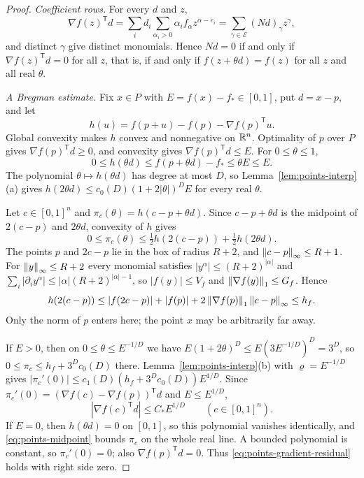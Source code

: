 \begin{proof}
\emph{Coefficient rows.} For every $d$ and $z$,
\[
 \nabla f(z)^{\mathsf T}d=\sum_i d_i\sum_{\alpha_i>0}\alpha_if_\alpha
 z^{\alpha-e_i}=\sum_{\gamma\in\mathcal E}(Nd)_\gamma z^\gamma ,
\]
and distinct $\gamma$ give distinct monomials. Hence $Nd=0$ if and only if
$\nabla f(z)^{\mathsf T}d=0$ for all $z$, that is, if and only if
$f(z+\theta d)=f(z)$ for all $z$ and all real $\theta$.

\emph{A Bregman estimate.} Fix $x\in P$ with
$E=f(x)-f_*\in[0,1]$, put $d=x-p$, and let
\[
 h(u)=f(p+u)-f(p)-\nabla f(p)^{\mathsf T}u .
\]
Global convexity makes $h$ convex and nonnegative on $\mathbb R^n$. Optimality of
$p$ over $P$ gives $\nabla f(p)^{\mathsf T}d\ge0$, and convexity gives
$\nabla f(p)^{\mathsf T}d\le E$. For $0\le\theta\le1$,
\[
 0\le h(\theta d)\le f(p+\theta d)-f_*\le\theta E\le E .
\]
The polynomial $\theta\mapsto h(\theta d)$ has degree at most $D$, so
Lemma~\ref{lem:points-interp}(a) gives
$h(2\theta d)\le c_0(D)(1+2|\theta|)^DE$ for every real $\theta$.

Let $c\in[0,1]^n$ and $\pi_c(\theta)=h(c-p+\theta d)$. Since
$c-p+\theta d$ is the midpoint of $2(c-p)$ and $2\theta d$, convexity of $h$
gives
\begin{equation}\label{eq:points-midpoint}
 0\le\pi_c(\theta)\le\tfrac12h(2(c-p))+\tfrac12h(2\theta d).
\end{equation}
The points $p$ and $2c-p$ lie in the box of radius $R+2$, and
$\left\lVert c-p\right\rVert_\infty\le R+1$. For $\left\lVert y\right\rVert_\infty\le R+2$ every monomial
satisfies $|y^\alpha|\le(R+2)^{|\alpha|}$ and
$\sum_i|\partial_iy^\alpha|\le|\alpha|(R+2)^{|\alpha|-1}$, so $|f(y)|\le V_f$
and $\left\lVert\nabla f(y)\right\rVert_1\le G_f$. Hence
\[
 h(2(c-p))\le|f(2c-p)|+|f(p)|+2\left\lVert\nabla f(p)\right\rVert_1\left\lVert c-p\right\rVert_\infty\le h_f .
\]
Only the norm of $p$ enters here; the point $x$ may be arbitrarily far
away.

If $E>0$, then on $0\le\theta\le E^{-1/D}$ we have
$E(1+2\theta)^D\le E(3E^{-1/D})^D=3^D$, so
$0\le\pi_c\le h_f+3^Dc_0(D)$ there. Lemma~\ref{lem:points-interp}(b) with
$\varrho=E^{-1/D}$ gives
$|\pi_c'(0)|\le c_1(D)(h_f+3^Dc_0(D))E^{1/D}$. Since
$\pi_c'(0)=(\nabla f(c)-\nabla f(p))^{\mathsf T}d$ and
$E\le E^{1/D}$,
\begin{equation}\label{eq:points-gradient-residual}
 |\nabla f(c)^{\mathsf T}d|\le C_*E^{1/D}\qquad(c\in[0,1]^n).
\end{equation}
If $E=0$, then $h(\theta d)=0$ on $[0,1]$, so this polynomial vanishes
identically, and \eqref{eq:points-midpoint} bounds $\pi_c$ on the whole real
line. A bounded polynomial is constant, so $\pi_c'(0)=0$; also
$\nabla f(p)^{\mathsf T}d=0$. Thus \eqref{eq:points-gradient-residual}
holds with right side zero.


\end{proof}

